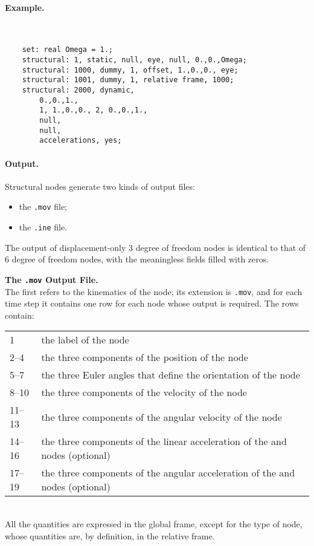 \paragraph{Example.} \
\begin{verbatim}
    set: real Omega = 1.;
    structural: 1, static, null, eye, null, 0.,0.,Omega;
    structural: 1000, dummy, 1, offset, 1.,0.,0., eye;
    structural: 1001, dummy, 1, relative frame, 1000;
    structural: 2000, dynamic,
        0.,0.,1.,
        1, 1.,0.,0., 2, 0.,0.,1.,
        null,
        null,
        accelerations, yes;
\end{verbatim}

\paragraph{Output.}
\label{sec:NODE:STRUCTURAL:OUTPUT}
Structural nodes generate two kinds of output files:
\begin{itemize}
\item the \texttt{.mov} file;
\item the \texttt{.ine} file.
\end{itemize}
The output of displacement-only 3 degree of freedom nodes is identical
to that of 6 degree of freedom nodes, with the meaningless fields
filled with zeros.

\textbf{The \texttt{.mov} Output File.} \\
The first refers to the kinematics of the node; its extension is \texttt{.mov},
and for each time step it contains one row for each node whose output is
required.
The rows contain: \vspace{2mm} \\
\begin{tabular}{lp{140mm}}
	\hline
	1      & the label of the node \\
	2--4   & the three components of the position of the node \\
	5--7   & the three Euler angles that define the orientation of the node \\
	8--10  & the three components of the velocity of the node \\
	11--13 & the three components of the angular velocity of the node \\
	\hline
	14--16 & the three components of the linear acceleration
		of the \kw{dynamic} and \kw{modal} nodes (optional) \\
	17--19 & the three components of the angular acceleration
		of the \kw{dynamic} and \kw{modal} nodes (optional) \\
	\hline
\end{tabular}\vspace{2mm}\\
All the quantities are expressed in the global frame, except for
the \kw{relative frame} type of \kw{dummy} node, whose quantities are,
by definition, in the relative frame.

